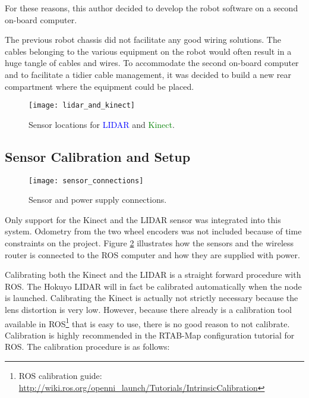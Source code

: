 For these reasons, this author decided to develop the robot software on a second on-board computer. 

The previous robot chassis did not facilitate any good wiring solutions. The cables belonging to the various equipment on the robot would often result in a huge tangle of cables and wires. To accommodate the second on-board computer and to facilitate a tidier cable management, it was decided to build a new rear compartment where the equipment could be placed.




\begin{figure}[h]
	\centering
	\texttt{[image: lidar\_and\_kinect]}
	\caption{Sensor locations for \textcolor{blue}{LIDAR} and \textcolor{green}{Kinect}. }
	\label{fig:kinect_and_lidar}
\end{figure}

\subsection{Sensor Calibration and Setup}

\begin{figure}[h]
	\centering
	\texttt{[image: sensor\_connections]}
	\caption{Sensor and power supply connections. }
	\label{fig:sensor_connections}
\end{figure}

Only support for the Kinect and the \ac{LIDAR} sensor was integrated into this system. Odometry from the two wheel encoders was not included because of time constraints on the project. Figure \ref{fig:sensor_connections} illustrates how the sensors and the wireless router is connected to the \ac{ROS} computer and how they are supplied with power.

Calibrating both the Kinect and the \ac{LIDAR} is a straight forward procedure with \ac{ROS}. The Hokuyo \ac{LIDAR} will in fact be calibrated automatically when the node is launched. Calibrating the Kinect is actually not strictly necessary because the lens distortion is very low. However, because there already is a calibration tool available in \ac{ROS}\footnote{ROS calibration guide: \url{http://wiki.ros.org/openni_launch/Tutorials/IntrinsicCalibration}} that is easy to use, there is no good reason to not calibrate. Calibration is highly recommended in the \ac{RTAB-Map} configuration tutorial for \ac{ROS}\cite{rtabmap_setup}. The calibration procedure is as follows:

